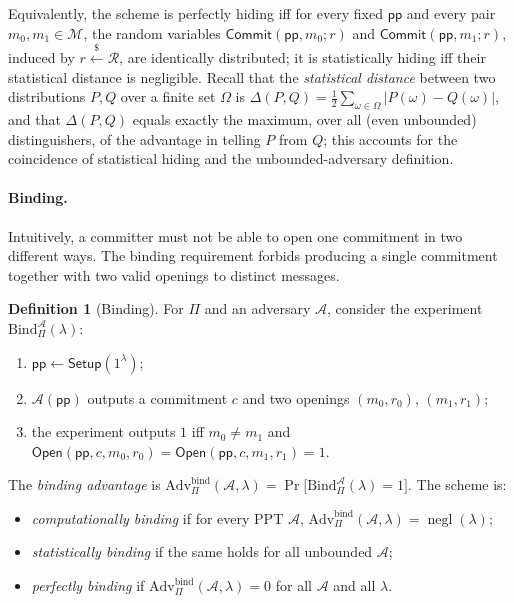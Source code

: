 \documentclass[11pt,a4paper]{article}
\theoremstyle{definition}
\newtheorem{definition}[theorem]{Definition}
\theoremstyle{remark}
\DeclareMathOperator{\negl}{negl}
\begin{document}
Equivalently, the scheme is perfectly hiding iff for every fixed \(\mathsf{pp}\) and every pair \(m_0, m_1 \in \mathcal{M}\), the random variables \(\mathsf{Commit}(\mathsf{pp}, m_0; r)\) and \(\mathsf{Commit}(\mathsf{pp}, m_1; r)\), induced by \(r \xleftarrow{\$} \mathcal{R}\), are identically distributed; it is statistically hiding iff their statistical distance is negligible. Recall that the \emph{statistical distance} between two distributions \(P, Q\) over a finite set \(\Omega\) is \(\Delta(P, Q) = \tfrac{1}{2}\sum_{\omega \in \Omega} |P(\omega) - Q(\omega)|\), and that \(\Delta(P,Q)\) equals exactly the maximum, over all (even unbounded) distinguishers, of the advantage in telling \(P\) from \(Q\); this accounts for the coincidence of statistical hiding and the unbounded-adversary definition.

\paragraph{Binding.}
Intuitively, a committer must not be able to open one commitment in two different ways. The binding requirement forbids producing a single commitment together with two valid openings to distinct messages.

\begin{definition}[Binding]\label{commitments:def:binding}
For \(\Pi\) and an adversary \(\mathcal{A}\), consider the experiment \(\mathrm{Bind}^{\mathcal{A}}_{\Pi}(\lambda)\):
\begin{enumerate}
  \item \(\mathsf{pp} \gets \mathsf{Setup}(1^\lambda)\);
  \item \(\mathcal{A}(\mathsf{pp})\) outputs a commitment \(c\) and two openings \((m_0, r_0)\), \((m_1, r_1)\);
  \item the experiment outputs \(1\) iff \(m_0 \ne m_1\) and \(\mathsf{Open}(\mathsf{pp}, c, m_0, r_0) = \mathsf{Open}(\mathsf{pp}, c, m_1, r_1) = 1\).
\end{enumerate}
The \emph{binding advantage} is \(\mathrm{Adv}^{\mathrm{bind}}_{\Pi}(\mathcal{A}, \lambda) = \Pr\bigl[\mathrm{Bind}^{\mathcal{A}}_{\Pi}(\lambda) = 1\bigr]\). The scheme is:
\begin{itemize}
  \item \emph{computationally binding} if for every PPT \(\mathcal{A}\), \(\mathrm{Adv}^{\mathrm{bind}}_{\Pi}(\mathcal{A}, \lambda) = \negl(\lambda)\);
  \item \emph{statistically binding} if the same holds for all unbounded \(\mathcal{A}\);
  \item \emph{perfectly binding} if \(\mathrm{Adv}^{\mathrm{bind}}_{\Pi}(\mathcal{A}, \lambda) = 0\) for all \(\mathcal{A}\) and all \(\lambda\).
\end{itemize}
\end{definition}
\end{document}
